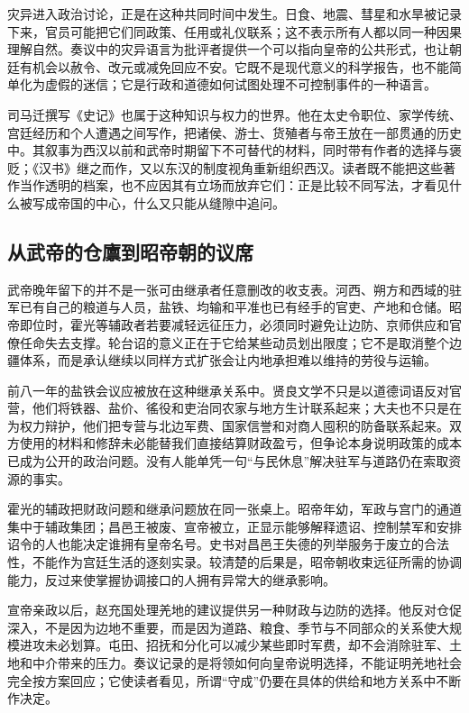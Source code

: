 灾异进入政治讨论，正是在这种共同时间中发生。日食、地震、彗星和水旱被记录下来，官员可能把它们同政策、任用或礼仪联系；这不表示所有人都以同一种因果理解自然。奏议中的灾异语言为批评者提供一个可以指向皇帝的公共形式，也让朝廷有机会以赦令、改元或减免回应不安。它既不是现代意义的科学报告，也不能简单化为虚假的迷信；它是行政和道德如何试图处理不可控制事件的一种语言。

司马迁撰写《史记》也属于这种知识与权力的世界。他在太史令职位、家学传统、宫廷经历和个人遭遇之间写作，把诸侯、游士、货殖者与帝王放在一部贯通的历史中。其叙事为西汉以前和武帝时期留下不可替代的材料，同时带有作者的选择与褒贬；《汉书》继之而作，又以东汉的制度视角重新组织西汉。读者既不能把这些著作当作透明的档案，也不应因其有立场而放弃它们：正是比较不同写法，才看见什么被写成帝国的中心，什么又只能从缝隙中追问。

\subsection{从武帝的仓廪到昭帝朝的议席}

武帝晚年留下的并不是一张可由继承者任意删改的收支表。河西、朔方和西域的驻军已有自己的粮道与人员，盐铁、均输和平准也已有经手的官吏、产地和仓储。昭帝即位时，霍光等辅政者若要减轻远征压力，必须同时避免让边防、京师供应和官僚任命失去支撑。轮台诏的意义正在于它给某些动员划出限度；它不是取消整个边疆体系，而是承认继续以同样方式扩张会让内地承担难以维持的劳役与运输。

前八一年的盐铁会议应被放在这种继承关系中。贤良文学不只是以道德词语反对官营，他们将铁器、盐价、徭役和吏治同农家与地方生计联系起来；大夫也不只是在为权力辩护，他们把专营与北边军费、国家信誉和对商人囤积的防备联系起来。双方使用的材料和修辞未必能替我们直接结算财政盈亏，但争论本身说明政策的成本已成为公开的政治问题。没有人能单凭一句“与民休息”解决驻军与道路仍在索取资源的事实。

霍光的辅政把财政问题和继承问题放在同一张桌上。昭帝年幼，军政与宫门的通道集中于辅政集团；昌邑王被废、宣帝被立，正显示能够解释遗诏、控制禁军和安排诏令的人也能决定谁拥有皇帝名号。史书对昌邑王失德的列举服务于废立的合法性，不能作为宫廷生活的逐刻实录。较清楚的后果是，昭帝朝收束远征所需的协调能力，反过来使掌握协调接口的人拥有异常大的继承影响。

宣帝亲政以后，赵充国处理羌地的建议提供另一种财政与边防的选择。他反对仓促深入，不是因为边地不重要，而是因为道路、粮食、季节与不同部众的关系使大规模进攻未必划算。屯田、招抚和分化可以减少某些即时军费，却不会消除驻军、土地和中介带来的压力。奏议记录的是将领如何向皇帝说明选择，不能证明羌地社会完全按方案回应；它使读者看见，所谓“守成”仍要在具体的供给和地方关系中不断作决定。

